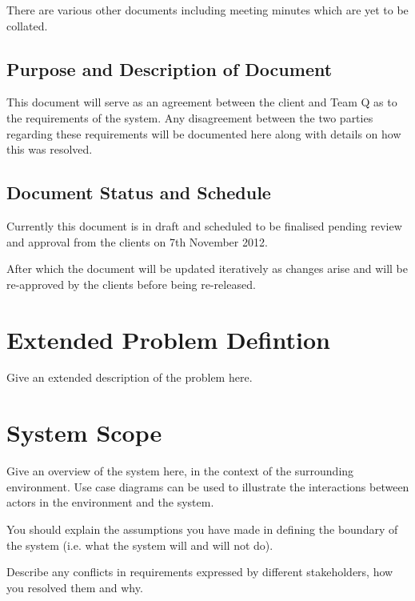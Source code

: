\documentclass{l3deliverable}
\begin{document}
There are various other documents including meeting minutes which are yet to
be collated.

\subsection{Purpose and Description of Document}

This document will serve as an agreement between the client and Team
Q as to the requirements of the system. Any disagreement between the
two parties regarding these requirements will be documented here along
with details on how this was resolved.

\subsection{Document Status and Schedule}

Currently this document is in draft and scheduled to be finalised
pending review and approval from the clients on 7th November 2012.

After which the document will be updated iteratively as changes
arise and will be re-approved by the clients before being re-released.

\section{Extended Problem Defintion}
\label{sec:extendedDefinition}


Give an extended description of the problem here.


\section{System Scope} %

Give an overview of the system here, in the context of the surrounding
environment.  Use case diagrams can be used to illustrate the
interactions between actors in the environment and the system.

You should explain the assumptions you have made in defining the
boundary of the system (i.e. what the system will and will not do).

Describe any conflicts in requirements expressed by different
stakeholders, how you resolved them and why.
\end{document}
